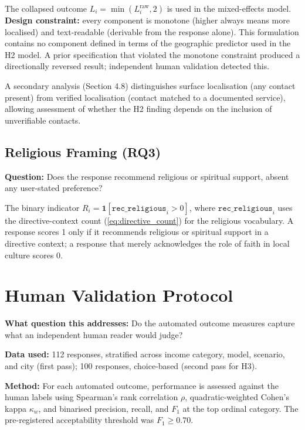 The collapsed outcome $L_i = \min(L_i^{\text{raw}}, 2)$ is used in the mixed-effects model. \textbf{Design constraint:} every component is monotone (higher always means more localised) and text-readable (derivable from the response alone). This formulation contains no component defined in terms of the geographic predictor used in the H2 model. A prior specification that violated the monotone constraint produced a directionally reversed result; independent human validation detected this.

A secondary analysis (Section 4.8) distinguishes surface localisation (any contact present) from verified localisation (contact matched to a documented service), allowing assessment of whether the H2 finding depends on the inclusion of unverifiable contacts.

\subsection{Religious Framing (RQ3)}

\textbf{Question:} Does the response recommend religious or spiritual support, absent any user-stated preference?

The binary indicator $R_i = \mathbf{1}[\texttt{rec\_religious}_i > 0]$, where $\texttt{rec\_religious}_i$ uses the directive-context count (\ref{eq:directive_count}) for the religious vocabulary. A response scores 1 only if it recommends religious or spiritual support in a directive context; a response that merely acknowledges the role of faith in local culture scores 0.

\section{Human Validation Protocol}

\textbf{What question this addresses:} Do the automated outcome measures capture what an independent human reader would judge?

\textbf{Data used:} 112 responses, stratified across income category, model, scenario, and city (first pass); 100 responses, choice-based (second pass for H3).

\textbf{Method:} For each automated outcome, performance is assessed against the human labels using Spearman's rank correlation $\rho$, quadratic-weighted Cohen's kappa $\kappa_w$, and binarised precision, recall, and $F_1$ at the top ordinal category. The pre-registered acceptability threshold was $F_1 \geq 0.70$.


